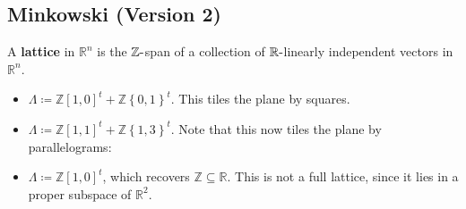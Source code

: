 \hypertarget{minkowski-version-2}{%
\subsection{Minkowski (Version 2)}\label{minkowski-version-2}}

\begin{definition}[Lattice]

A \textbf{lattice} in \({\mathbb{R}}^n\) is the
\({\mathbb{Z}}{\hbox{-}}\)span of a collection of
\({\mathbb{R}}{\hbox{-}}\)linearly independent vectors in
\({\mathbb{R}}^n\).

\end{definition}

\begin{example}[$n=2$]

\envlist

\begin{itemize}
\tightlist
\item
  \(\Lambda \coloneqq{\mathbb{Z}}{\left[ {1, 0} \right]}^t + {\mathbb{Z}}\left\{{0, 1}\right\}^t\).
  This tiles the plane by squares.
\item
  \(\Lambda \coloneqq{\mathbb{Z}}{\left[ {1, 1} \right]}^t + {\mathbb{Z}}\left\{{1, 3}\right\}^t\).
  Note that this now tiles the plane by parallelograms:
\end{itemize}

\begin{figure}
\centering
{}
\end{figure}

\begin{itemize}
\tightlist
\item
  \(\Lambda \coloneqq{\mathbb{Z}}{\left[ {1, 0} \right]}^t\), which
  recovers \({\mathbb{Z}}\subseteq {\mathbb{R}}\). This is not a full
  lattice, since it lies in a proper subspace of \({\mathbb{R}}^2\).
\end{itemize}


\end{example}
